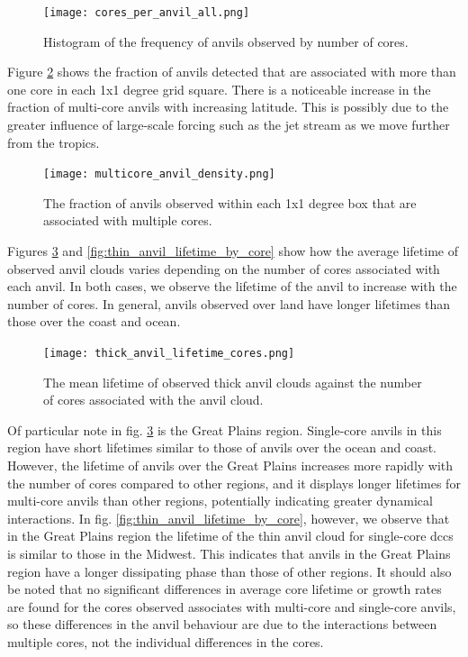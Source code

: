 \begin{figure}[b]
    \centering
    \texttt{[image: cores\_per\_anvil\_all.png]}
    \caption{Histogram of the frequency of anvils observed by number of cores.}
    \label{fig:multicore_frequency}
\end{figure}

Figure \ref{fig:multicore_fraction_map} shows the fraction of anvils detected that are associated with more than one core in each 1x1 degree grid square.
There is a noticeable increase in the fraction of multi-core anvils with increasing latitude.
This is possibly due to the greater influence of large-scale forcing such as the jet stream as we move further from the tropics.

\begin{figure}[t]
    \centering
    \texttt{[image: multicore\_anvil\_density.png]}
    \caption{The fraction of anvils observed within each 1x1 degree box that are associated with multiple cores.}
    \label{fig:multicore_fraction_map}
\end{figure}

Figures \ref{fig:anvil_lifetime_by_core} and \ref{fig:thin_anvil_lifetime_by_core} show how the average lifetime of observed anvil clouds varies depending on the number of cores associated with each anvil.
In both cases, we observe the lifetime of the anvil to increase with the number of cores.
In general, anvils observed over land have longer lifetimes than those over the coast and ocean.

\begin{figure}[h]
    \centering
    \texttt{[image: thick\_anvil\_lifetime\_cores.png]}
    \caption{The mean lifetime of observed thick anvil clouds against the number of cores associated with the anvil cloud.}
    \label{fig:anvil_lifetime_by_core}
\end{figure}

Of particular note in fig. \ref{fig:anvil_lifetime_by_core} is the Great Plains region.
Single-core anvils in this region have short lifetimes similar to those of anvils over the ocean and coast.
However, the lifetime of anvils over the Great Plains increases more rapidly with the number of cores compared to other regions, and it displays longer lifetimes for multi-core anvils than other regions, potentially indicating greater dynamical interactions.
In fig. \ref{fig:thin_anvil_lifetime_by_core}, however, we observe that in the Great Plains region the lifetime of the thin anvil cloud for single-core \acrshort{dcc}s is similar to those in the Midwest.
This indicates that anvils in the Great Plains region have a longer dissipating phase than those of other regions.
It should also be noted that no significant differences in average core lifetime or growth rates are found for the cores observed associates with multi-core and single-core anvils, so these differences in the anvil behaviour are due to the interactions between multiple cores, not the individual differences in the cores.

